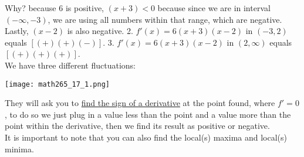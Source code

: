 \documentclass[12pt, letterpaper]{article}
\begin{document}
Why? because \(6\) is positive, \((x+3) < 0 \) because since we are in interval \((-\infty,-3)\), we are using all numbers within that range, which are negative.\\
\newline
Lastly, \((x-2)\) is also negative.
2. \(f'(x)=6(x+3)(x-2)\) in \((-3,2)\) equals \([(+)(+)(-)]\).
3. \(f'(x)=6(x+3)(x-2)\) in \((2,\infty)\) equals \([(+)(+)(+)]\).\\
\newline
We have three different fluctuations:\\
\newline
\begin{center}
    \texttt{[image: math265\_17\_1.png]}
\end{center}
They will ask you to \underline{find the sign of a derivative} at the point found, where \(f' = 0\), to do so we just plug in a value less than the point and a value more than the point within the derivative, then we find its result as positive or negative. \\
\newline
It is important to note that you can also find the local(s) maxima and local(s) minima.
\end{document}

